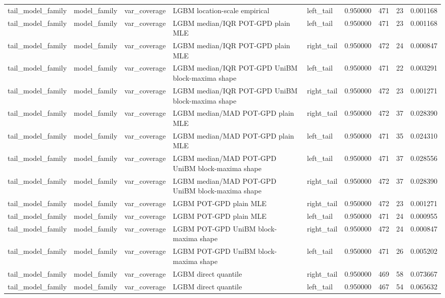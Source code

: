 \begin{tabular}{lllllrrrr}
tail\_model\_family & model\_family & var\_coverage & LGBM location-scale empirical & left\_tail & 0.950000 & 471 & 23 & 0.001168 \\
tail\_model\_family & model\_family & var\_coverage & LGBM median/IQR POT-GPD plain MLE & left\_tail & 0.950000 & 471 & 23 & 0.001168 \\
tail\_model\_family & model\_family & var\_coverage & LGBM median/IQR POT-GPD plain MLE & right\_tail & 0.950000 & 472 & 24 & 0.000847 \\
tail\_model\_family & model\_family & var\_coverage & LGBM median/IQR POT-GPD UniBM block-maxima shape & left\_tail & 0.950000 & 471 & 22 & 0.003291 \\
tail\_model\_family & model\_family & var\_coverage & LGBM median/IQR POT-GPD UniBM block-maxima shape & right\_tail & 0.950000 & 472 & 23 & 0.001271 \\
tail\_model\_family & model\_family & var\_coverage & LGBM median/MAD POT-GPD plain MLE & right\_tail & 0.950000 & 472 & 37 & 0.028390 \\
tail\_model\_family & model\_family & var\_coverage & LGBM median/MAD POT-GPD plain MLE & left\_tail & 0.950000 & 471 & 35 & 0.024310 \\
tail\_model\_family & model\_family & var\_coverage & LGBM median/MAD POT-GPD UniBM block-maxima shape & left\_tail & 0.950000 & 471 & 37 & 0.028556 \\
tail\_model\_family & model\_family & var\_coverage & LGBM median/MAD POT-GPD UniBM block-maxima shape & right\_tail & 0.950000 & 472 & 37 & 0.028390 \\
tail\_model\_family & model\_family & var\_coverage & LGBM POT-GPD plain MLE & right\_tail & 0.950000 & 472 & 23 & 0.001271 \\
tail\_model\_family & model\_family & var\_coverage & LGBM POT-GPD plain MLE & left\_tail & 0.950000 & 471 & 24 & 0.000955 \\
tail\_model\_family & model\_family & var\_coverage & LGBM POT-GPD UniBM block-maxima shape & right\_tail & 0.950000 & 472 & 24 & 0.000847 \\
tail\_model\_family & model\_family & var\_coverage & LGBM POT-GPD UniBM block-maxima shape & left\_tail & 0.950000 & 471 & 26 & 0.005202 \\
tail\_model\_family & model\_family & var\_coverage & LGBM direct quantile & right\_tail & 0.950000 & 469 & 58 & 0.073667 \\
tail\_model\_family & model\_family & var\_coverage & LGBM direct quantile & left\_tail & 0.950000 & 467 & 54 & 0.065632 \\

\end{tabular}
